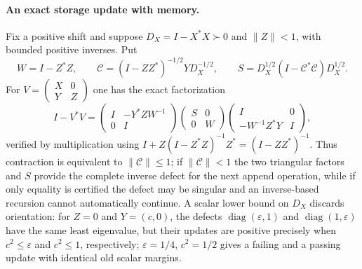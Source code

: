 \documentclass[11pt]{article}
\numberwithin{equation}{section}
\theoremstyle{definition}
\theoremstyle{remark}
\newcommand{\norm}[1]{\lVert#1\rVert}
\begin{document}
\paragraph{An exact storage update with memory.}
Fix a positive shift and suppose $D_X=I-X^*X\succ0$ and $\norm Z<1$,
with bounded positive inverses. Put
\[
 W=I-Z^*Z,\qquad
 \mathcal C=(I-ZZ^*)^{-1/2}YD_X^{-1/2},\qquad
 S=D_X^{1/2}(I-\mathcal C^*\mathcal C)D_X^{1/2}.
\]
For $V=\left(\begin{smallmatrix}X&0\\Y&Z\end{smallmatrix}\right)$ one has
the exact factorization
\begin{equation}\label{eq:storage-factor}
 I-V^*V=
 \begin{pmatrix}I&-Y^*ZW^{-1}\\0&I\end{pmatrix}
 \begin{pmatrix}S&0\\0&W\end{pmatrix}
 \begin{pmatrix}I&0\\-W^{-1}Z^*Y&I\end{pmatrix},
\end{equation}
verified by multiplication using $I+Z(I-Z^*Z)^{-1}Z^*=(I-ZZ^*)^{-1}$.
Thus contraction is equivalent to $\norm{\mathcal C}\le1$; if
$\norm{\mathcal C}<1$ the two triangular factors and $S$ provide the complete
inverse defect for the next append operation, while if only equality is
certified the defect may be singular and an inverse-based recursion cannot
automatically continue. A scalar lower bound on $D_X$ discards orientation:
for $Z=0$ and $Y=(c,0)$, the defects $\operatorname{diag}(\varepsilon,1)$ and
$\operatorname{diag}(1,\varepsilon)$ have the same least eigenvalue, but their
updates are positive precisely when $c^2\le\varepsilon$ and $c^2\le1$,
respectively; $\varepsilon=1/4$, $c^2=1/2$ gives a failing and a passing
update with identical old scalar margins.
\end{document}
